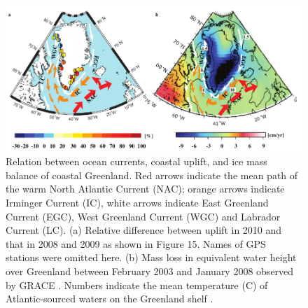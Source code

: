 \clearpage
\begin{figure}
 \centering
 \includegraphics{figs_chpt3/2012GC004432-p16.pdf} 
 \caption[Relation between ocean currents, coastal uplift, and ice mass balance of coastal Greenland.]{Relation between ocean currents, coastal uplift, and ice mass balance of coastal Greenland. Red arrows indicate the mean path of the warm North Atlantic Current (NAC); orange arrows indicate Irminger Current (IC), white arrows indicate East Greenland Current (EGC), West Greenland Current (WGC) and Labrador Current (LC). (a) Relative difference between uplift in 2010 and that in 2008 and 2009 as shown in Figure 15. Names of GPS stations were omitted here. (b) Mass loss in equivalent water height over Greenland between February 2003 and January 2008 observed by GRACE \cite[]{wouters2008grace}. Numbers indicate the mean temperature (\textordmasculine C) of Atlantic-sourced waters on the Greenland shelf \cite[]{straneo2012characteristics}.}
 \label{fig:fig16}
\end{figure}